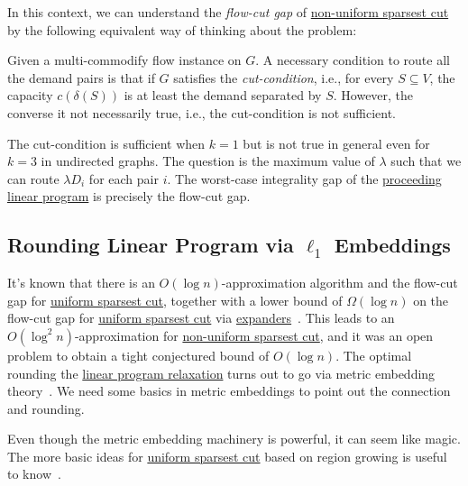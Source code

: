 In this context, we can understand the \emph{flow-cut gap} of \hyperref[prb:non-uniform-sparsest-cut]{non-uniform sparsest cut} by the following equivalent way of thinking about the problem:

\begin{intuition}
	Given a multi-commodify flow instance on \(G\). A necessary condition to route all the demand pairs is that if \(G\) satisfies the \emph{cut-condition}, i.e., for every \(S \subseteq V\), the capacity \(c(\delta (S))\) is at least the demand separated by \(S\). However, the converse it not necessarily true, i.e., the cut-condition is not sufficient.
\end{intuition}

The cut-condition is sufficient when \(k = 1\) but is not true in general even for \(k = 3\) in undirected graphs. The question is the maximum value of \(\lambda \) such that we can route \(\lambda D_i\) for each pair \(i\). The worst-case integrality gap of the \hyperref[eq:non-uniform-sparsest-cut-LP-primal]{proceeding linear program} is precisely the flow-cut gap.

\subsection{Rounding Linear Program via \(\ell _1\) Embeddings}
It's known that there is an \(O(\log n)\)-approximation algorithm and the flow-cut gap for \hyperref[prb:sparsest-cut]{uniform sparsest cut}, together with a lower bound of \(\Omega (\log n)\) on the flow-cut gap for \hyperref[prb:sparsest-cut]{uniform sparsest cut} via \hyperref[def:expander]{expanders}~\cite{leighton1999multicommodity}. This leads to an \(O(\log ^2 n)\)-approximation for \hyperref[prb:non-uniform-sparsest-cut]{non-uniform sparsest cut}, and it was an open problem to obtain a tight conjectured bound of \(O(\log n)\). The optimal rounding the \hyperref[eq:non-uniform-sparsest-cut-LP-primal]{linear program relaxation} turns out to go via metric embedding theory~\cite{linial1995geometry,aumann1998log}. We need some basics in metric embeddings to point out the connection and rounding.

\begin{note}
	Even though the metric embedding machinery is powerful, it can seem like magic. The more basic ideas for \hyperref[prb:sparsest-cut]{uniform sparsest cut} based on region growing is useful to know~\cite{williamson2011design}.
\end{note}

